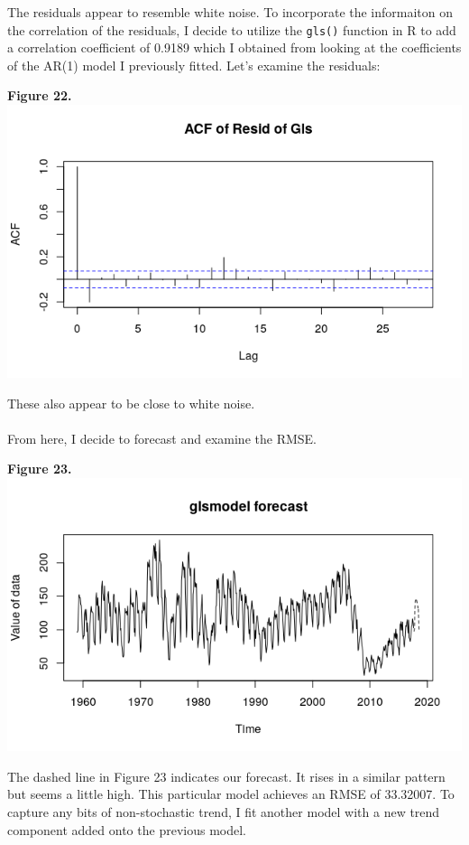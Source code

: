 \documentclass[11pt]{article}
\begin{document}
The residuals appear to resemble white noise. To incorporate the informaiton on the correlation of the residuals, I decide to utilize the {\tt gls()} function in R to add a correlation coefficient of 0.9189 which I obtained from looking at the coefficients of the AR(1) model I previously fitted. Let's examine the residuals:
\begin{center}
\textbf{Figure 22.}
\\
\includegraphics[scale=1]{gls1}
\end{center}
These also appear to be close to white noise.
\\\\
From here, I decide to forecast and examine the RMSE.
\begin{center}
\textbf{Figure 23.}
\\
\includegraphics[scale=1]{glsFor}
\end{center}
The dashed line in Figure 23 indicates our forecast. It rises in a similar pattern but seems a little high. This particular model achieves an RMSE of 33.32007. To capture any bits of non-stochastic trend, I fit another model with a new trend component added onto the previous model.
\end{document}
